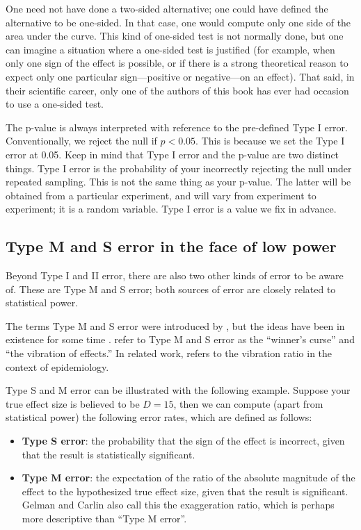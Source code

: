 \documentclass[12pt,]{krantz}
\providecommand{\tightlist}{%
  \setlength{\itemsep}{0pt}\setlength{\parskip}{0pt}}
\begin{document}
One need not have done a two-sided alternative; one could have defined the alternative to be one-sided. In that case, one would compute only one side of the area under the curve. This kind of one-sided test is not normally done, but one can imagine a situation where a one-sided test is justified (for example, when only one sign of the effect is possible, or if there is a strong theoretical reason to expect only one particular sign---positive or negative---on an effect). That said, in their scientific career, only one of the authors of this book has ever had occasion to use a one-sided test.

The p-value is always interpreted with reference to the pre-defined Type I error. Conventionally, we reject the null if \(p<0.05\). This is because we set the Type I error at 0.05. Keep in mind that Type I error and the p-value are two distinct things.
Type I error is the probability of your incorrectly rejecting the null under repeated sampling. This is not the same thing as your p-value. The latter will be obtained from a particular experiment, and will vary from experiment to experiment; it is a random variable. Type I error is a value we fix in advance.

\hypertarget{type-m-and-s-error-in-the-face-of-low-power}{%
\subsection{Type M and S error in the face of low power}\label{type-m-and-s-error-in-the-face-of-low-power}}

Beyond Type I and II error, there are also two other kinds of error to be aware of. These are Type M and S error; both sources of error are closely related to statistical power.

The terms Type M and S error were introduced by \citet{Gelman14}, but the ideas have been in existence for some time \citep[\citet{lane1978estimating}]{hedges1984estimation}. \citet{powerfailure} refer to Type M and S error as the ``winner's curse'' and ``the vibration of effects.'' In related work, \citet{ioannidis2008most} refers to the vibration ratio in the context of epidemiology.

Type S and M error can be illustrated with the following example.
Suppose your true effect size is believed to be \(D=15\),
then we can compute (apart from statistical power) the following error rates, which are defined as follows:

\begin{itemize}
\tightlist
\item
  \textbf{Type S error}: the probability that the sign of the effect is incorrect, given that the result is statistically significant.
\item
  \textbf{Type M error}: the expectation of the ratio of the absolute magnitude of the effect to the hypothesized true effect size, given that the result is significant.
  Gelman and Carlin also call this the exaggeration ratio, which is perhaps more descriptive than ``Type M error''.
\end{itemize}
\end{document}
